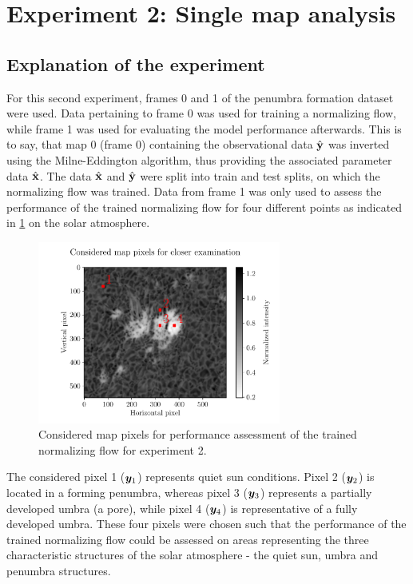 \documentclass[a4paper,12pt]{report}
\begin{document}
\section{Experiment 2: Single map analysis}
\subsection{Explanation of the experiment}
For this second experiment, frames 0 and 1 of the penumbra formation dataset were used. Data pertaining to frame 0 was used for training a normalizing flow, while frame 1 was used for evaluating the model performance afterwards. This is to say, that map 0 (frame 0) containing the observational data $\hat{\boldsymbol{\mathbf{y}}}$ was inverted using the Milne-Eddington algorithm, thus providing the associated parameter data $\hat{\boldsymbol{\mathbf{x}}}$. The data $\hat{\boldsymbol{\mathbf{x}}}$ and $\hat{\boldsymbol{\mathbf{y}}}$ were split into train and test splits, on which the normalizing flow was trained. Data from frame 1 was only used to assess the performance of the trained normalizing flow for four different points as indicated in \cref{fig:nf-milne-eddington-example-6-considered-map-pixels-nflows-piecewisequadratic} on the solar atmosphere.
\begin{figure}[h]
\centering
\includegraphics[width=8cm]{figures/nf-milne-eddington-example-6-considered-map-pixels-nflows-piecewisequadratic.pdf}
\caption{Considered map pixels for performance assessment of the trained normalizing flow for experiment 2.}
\label{fig:nf-milne-eddington-example-6-considered-map-pixels-nflows-piecewisequadratic}
\end{figure}
The considered pixel 1 ($\bm{y}_1$) represents quiet sun conditions. Pixel 2 ($\bm{y}_2$) is located in a forming penumbra, whereas pixel 3 ($\bm{y}_3$) represents a partially developed umbra (a pore), while pixel 4 ($\bm{y}_4$) is representative of a fully developed umbra. These four pixels were chosen such that the performance of the trained normalizing flow could be assessed on areas representing the three characteristic structures of the solar atmosphere - the quiet sun, umbra and penumbra structures.
\end{document}
